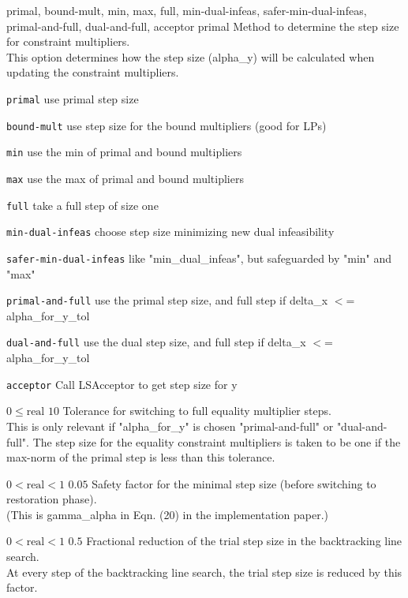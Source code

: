 %
{\ttfamily primal, bound-mult, min, max, full, min-dual-infeas, safer-min-dual-infeas, primal-and-full, dual-and-full, acceptor}%
{primal}%
{Method to determine the step size for constraint multipliers.\\
This option determines how the step size (alpha\_y) will be calculated when updating the constraint multipliers.}%
{\begin{list}{}{
\setlength{\parsep}{0em}
\setlength{\leftmargin}{5ex}
\setlength{\labelwidth}{2ex}
\setlength{\itemindent}{0ex}
\setlength{\topsep}{0pt}}
\item[\texttt{primal}] use primal step size
\item[\texttt{bound-mult}] use step size for the bound multipliers (good for LPs)
\item[\texttt{min}] use the min of primal and bound multipliers
\item[\texttt{max}] use the max of primal and bound multipliers
\item[\texttt{full}] take a full step of size one
\item[\texttt{min-dual-infeas}] choose step size minimizing new dual infeasibility
\item[\texttt{safer-min-dual-infeas}] like "min\_dual\_infeas", but safeguarded by "min" and "max"
\item[\texttt{primal-and-full}] use the primal step size, and full step if delta\_x $<$= alpha\_for\_y\_tol
\item[\texttt{dual-and-full}] use the dual step size, and full step if delta\_x $<$= alpha\_for\_y\_tol
\item[\texttt{acceptor}] Call LSAcceptor to get step size for y
\end{list}
}

%
{$0\leq\textrm{real}$}%
{$10$}%
{Tolerance for switching to full equality multiplier steps.\\
This is only relevant if "alpha\_for\_y" is chosen "primal-and-full" or "dual-and-full".  The step size for the equality constraint multipliers is taken to be one if the max-norm of the primal step is less than this tolerance.}%
{}

%
{$0<\textrm{real}<1$}%
{$0.05$}%
{Safety factor for the minimal step size (before switching to restoration phase).\\
(This is gamma\_alpha in Eqn. (20) in the implementation paper.)}%
{}

%
{$0<\textrm{real}<1$}%
{$0.5$}%
{Fractional reduction of the trial step size in the backtracking line search.\\
At every step of the backtracking line search, the trial step size is reduced by this factor.}%
{}

